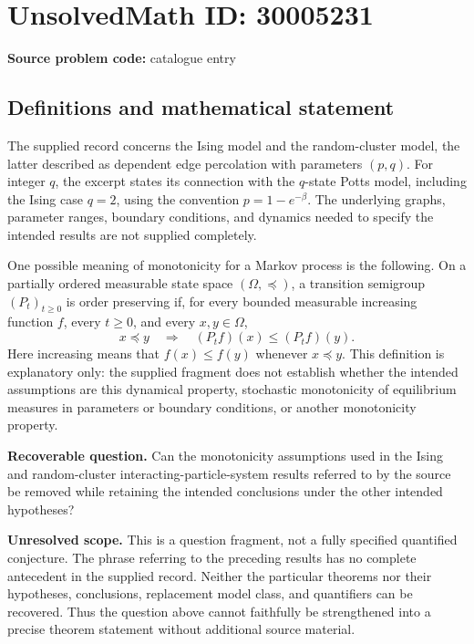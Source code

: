 \documentclass[11pt]{article}
\begin{document}
\section*{UnsolvedMath ID: 30005231}
\textbf{Source problem code:} catalogue entry
\subsection{Definitions and mathematical statement}
The supplied record concerns the Ising model and the random-cluster model, the latter described as dependent edge percolation with parameters \((p,q)\). For integer \(q\), the excerpt states its connection with the \(q\)-state Potts model, including the Ising case \(q=2\), using the convention \(p=1-e^{-\beta}\). The underlying graphs, parameter ranges, boundary conditions, and dynamics needed to specify the intended results are not supplied completely.

One possible meaning of monotonicity for a Markov process is the following. On a partially ordered measurable state space \((\Omega,\preceq)\), a transition semigroup \((P_t)_{t\geq0}\) is order preserving if, for every bounded measurable increasing function \(f\), every \(t\geq0\), and every \(x,y\in\Omega\),
\[
 x\preceq y\quad\Longrightarrow\quad (P_tf)(x)\leq(P_tf)(y).
\]
Here increasing means that \(f(x)\leq f(y)\) whenever \(x\preceq y\). This definition is explanatory only: the supplied fragment does not establish whether the intended assumptions are this dynamical property, stochastic monotonicity of equilibrium measures in parameters or boundary conditions, or another monotonicity property.

\textbf{Recoverable question.} Can the monotonicity assumptions used in the Ising and random-cluster interacting-particle-system results referred to by the source be removed while retaining the intended conclusions under the other intended hypotheses?

\textbf{Unresolved scope.} This is a question fragment, not a fully specified quantified conjecture. The phrase referring to the preceding results has no complete antecedent in the supplied record. Neither the particular theorems nor their hypotheses, conclusions, replacement model class, and quantifiers can be recovered. Thus the question above cannot faithfully be strengthened into a precise theorem statement without additional source material.
\end{document}
